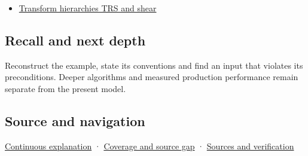 \hypertarget{appendix-d1ea57347893-used-by}{}

\begin{itemize}
\tightlist
\item
  \hyperref[appendix-292c061cd47c]{Transform hierarchies TRS and shear}
\end{itemize}

\subsection{Recall and next depth}\label{appendix-d1ea57347893-recall-and-next-depth}

\hypertarget{appendix-d1ea57347893-recall-and-next-depth}{}

Reconstruct the example, state its conventions and find an input that violates its preconditions. Deeper algorithms and measured production performance remain separate from the present model.

\subsection{Source and navigation}\label{appendix-d1ea57347893-source-and-navigation}

\hypertarget{appendix-d1ea57347893-source-and-navigation}{}

\hyperref[01-foundations-i-ch018-keep-the-promises-visible-while-moving-between-representations]{Continuous explanation} · \hyperref[appendix-fd090d982a15-phase-7---parts-601-700]{Coverage and source gap} · \hyperref[appendix-a103e7846d21-phase-7---source-analysis-and-verification]{Sources and verification}
